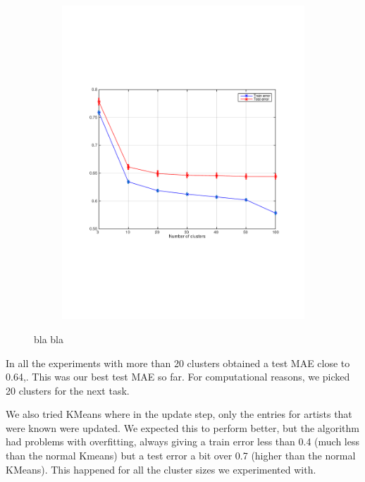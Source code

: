 \begin{figure}[h]
\begin{subfigure}[b]{0.45\textwidth}
  \end{subfigure}
  \begin{subfigure}[b]{0.45\textwidth}
    \includegraphics[width=\textwidth]{figures/kmeans_train_test.pdf}
    \caption{}
  \end{subfigure}
  \caption{bla bla}
  \label{fig:kmeans_final}
\end{figure}

In all the experiments with more than 20 clusters obtained a test MAE close to 0.64,.
This was our best test MAE so far. 
For computational reasons, we picked 20 clusters for the next task.

We also tried KMeans where in the update step, only the entries for artists that were known were updated. We expected this to perform better, but the algorithm had problems with overfitting, always giving a train error less than 0.4 (much less than the normal Kmeans) but a test error a bit over 0.7 (higher than the normal KMeans). This happened for all the cluster sizes we experimented with.

